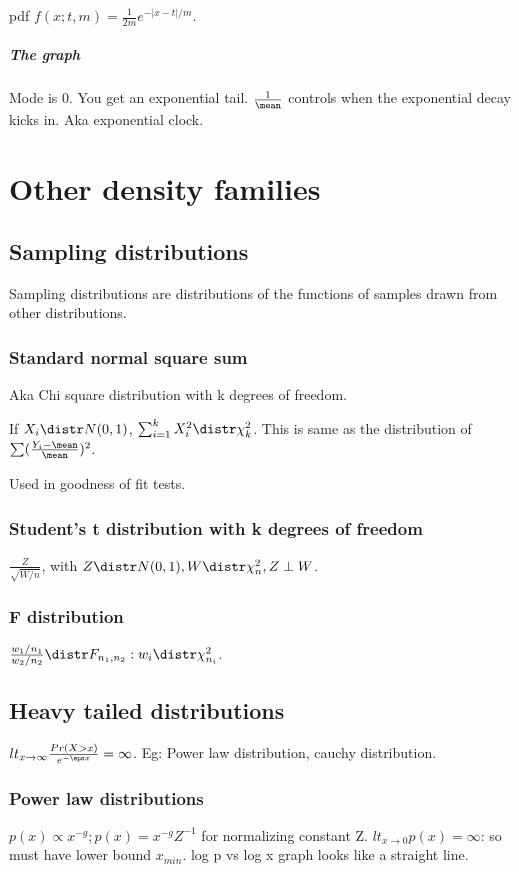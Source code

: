 \documentclass[oneside, article]{memoir}
\begin{document}
pdf $f(x; t, m) = \frac{1}{2m} e^{-|x - t|/m}$.


\paragraph*{The graph}
Mode is 0. You get an exponential tail. $\frac{1}{\mean}$ controls when the exponential decay kicks in. Aka exponential clock.


\chapter{Other density families}
\section{Sampling distributions}
Sampling distributions are distributions of the functions of samples drawn from other distributions.

\subsection{Standard normal square sum}
Aka Chi square distribution with k degrees of freedom.

If $X_{i} \distr N(0, 1)$, $\sum_{i=1}^{k} X_{i}^{2} \distr \chi_{k}^{2}$. This is same as the distribution of $\sum (\frac{Y_{i} - \mean}{\mean})^{2}$.

Used in goodness of fit tests. \chk

\subsection{Student's t distribution with k degrees of freedom}
$\frac{Z}{\sqrt{W/n}}$, with $Z \distr N(0, 1), W \distr \chi^{2}_{n}, Z \perp W$.

\subsection{F distribution}
$\frac{w_{1}/n_{1}}{w_{2}/ n_{2}} \distr F_{n_{1}, n_{2}} : w_{i} \distr \chi^{2}_{n_{i}}$.

\section{Heavy tailed distributions}
$lt_{x \to \infty}\frac{Pr(X>x)}{e^{-\eps x}} = \infty$. Eg: Power law distribution, cauchy distribution.

\subsection{Power law distributions}
$p(x) \propto x^{-g}; p(x) = x^{-g}Z^{-1}$ for normalizing constant Z. $lt_{x \to 0} p(x) = \infty$: so must have lower bound $x_{min}$. log p vs log x graph looks like a straight line.
\end{document}
